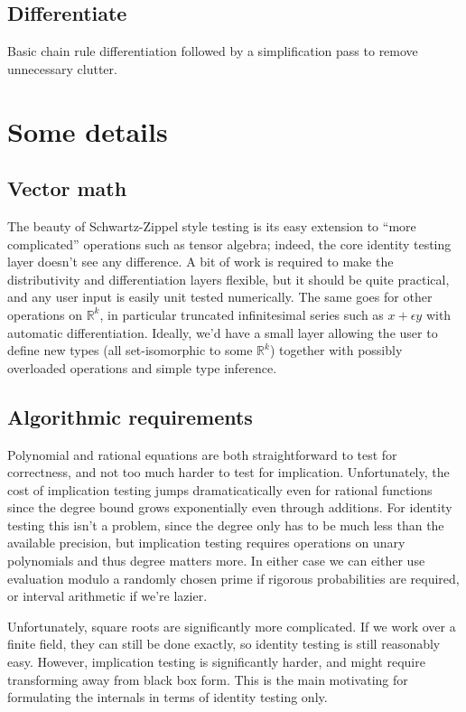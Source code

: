 \documentclass[11pt]{article}
\newcommand{\R}{\mathbb{R}}
\newcommand{\blue}[1]{{\color{blue} #1}}
\begin{document}
\subsection{\blue{Differentiate}}
Basic chain rule differentiation followed by a simplification pass to remove unnecessary clutter.

\section{Some details}

\subsection{Vector math}

The beauty of Schwartz-Zippel style testing is its easy extension to ``more complicated'' operations such
as tensor algebra; indeed, the core identity testing layer doesn't see any difference.
A bit of work is required to make the distributivity and differentiation layers flexible, but it should
be quite practical, and any user input is easily unit tested numerically.   The same goes for other
operations on $\R^k$, in particular truncated infinitesimal series such as $x + \epsilon y$ with automatic
differentiation.  Ideally, we'd have a small layer allowing the user to define new types (all set-isomorphic
to some $\R^k$) together with possibly overloaded operations and simple type inference.

\subsection{Algorithmic requirements}

Polynomial and rational equations are both straightforward to test for correctness, and not too much harder
to test for implication.  Unfortunately, the cost of implication testing jumps dramaticatically even for
rational functions since the degree bound grows exponentially even through additions.  For identity testing
this isn't a problem, since the degree only has to be much less than the available precision, but implication
testing requires operations on unary polynomials and thus degree matters more.  In either case we can either
use evaluation modulo a randomly chosen prime if rigorous probabilities are required, or interval arithmetic
if we're lazier.

Unfortunately, square roots are significantly more complicated.  If we work over a finite field, they
can still be done exactly, so identity testing is still reasonably easy.  However, implication testing
is significantly harder, and might require transforming away from black box form.  This is the main motivating
for formulating the internals in terms of identity testing only.
\end{document}
